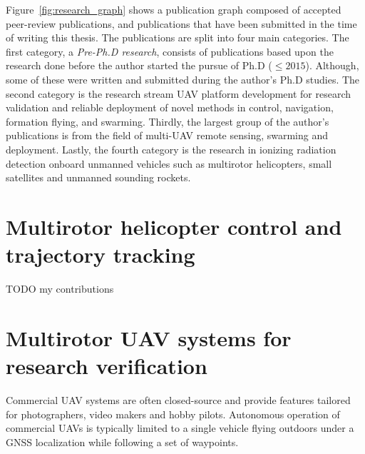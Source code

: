 \documentclass[a4paper,11pt,titlepage,twoside]{book}
\newcommand{\todo}[1]{{\color{red} TODO {#1}}}
\begin{document}
Figure~\ref{fig:research_graph} shows a publication graph composed of accepted peer-review publications, and publications that have been submitted in the time of writing this thesis.
The publications are split into four main categories.
The first category, a \emph{Pre-Ph.D research}, consists of publications based upon the research done before the author started the pursue of Ph.D ($\leq 2015$).
Although, some of these were written and submitted during the author's Ph.D studies.
The second category is the research stream \ac{UAV} platform development for research validation and reliable deployment of novel methods in control, navigation, formation flying, and swarming.
Thirdly, the largest group of the author's publications is from the field of multi-\ac{UAV} remote sensing, swarming and deployment.
Lastly, the fourth category is the research in ionizing radiation detection onboard unmanned vehicles such as multirotor helicopters, small satellites and unmanned sounding rockets.

\section{Multirotor helicopter control and trajectory tracking}

\todo{my contributions}
\cite{baca2016embedded} %
\cite{baca2018model} %
\cite{baca2020mrs} %

\section{Multirotor UAV systems for research verification}

Commercial \ac{UAV} systems are often closed-source and provide features tailored for photographers, video makers and hobby pilots.
Autonomous operation of commercial \acp{UAV} is typically limited to a single vehicle flying outdoors under a \ac{GNSS} localization while following a set of waypoints.

\end{document}
